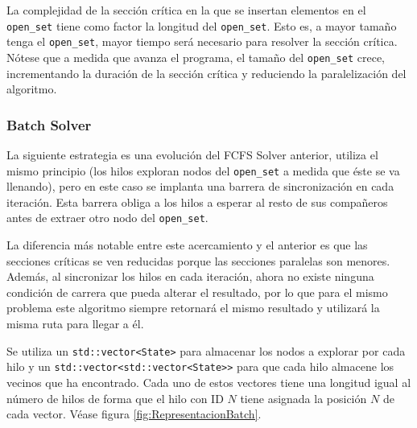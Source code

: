 \begin{notebox}
    La complejidad de la sección crítica en la que se insertan
    elementos en el \lstinline{open_set}
    tiene como factor la longitud del \lstinline{open_set}. 
    Esto es, a mayor tamaño tenga el \lstinline{open_set},
    mayor tiempo será necesario para resolver la sección crítica.\\

    Nótese que a medida que avanza el programa,
    el tamaño del \lstinline{open_set} crece,
    incrementando la duración de la sección crítica y
    reduciendo la paralelización del algoritmo. 
\end{notebox}

\subsubsection{Batch Solver}

La siguiente estrategia es una evolución del FCFS Solver anterior,
utiliza el mismo principio (los hilos exploran nodos del \lstinline{open_set}
a medida que éste se va llenando),
pero en este caso se implanta una barrera de sincronización en cada iteración.
Esta barrera obliga a los hilos a esperar al resto de sus compañeros
antes de extraer otro nodo del \lstinline{open_set}.

La diferencia más notable entre este acercamiento y el anterior es que
las secciones críticas se ven reducidas porque las secciones paralelas
son menores.
Además, al sincronizar los hilos en cada iteración, ahora no existe ninguna
condición de carrera que pueda alterar el resultado, por lo que
para el mismo problema este algoritmo siempre retornará el mismo resultado
y utilizará la misma ruta para llegar a él.

Se utiliza un \lstinline{std::vector<State>} para almacenar los nodos
a explorar por cada hilo y un \lstinline{std::vector<std::vector<State>>}
para que cada hilo almacene los vecinos que ha encontrado.
Cada uno de estos vectores tiene una longitud igual al número de hilos
de forma que el hilo con ID $N$ tiene asignada la posición $N$ de cada
vector. Véase figura \ref{fig:RepresentacionBatch}.

